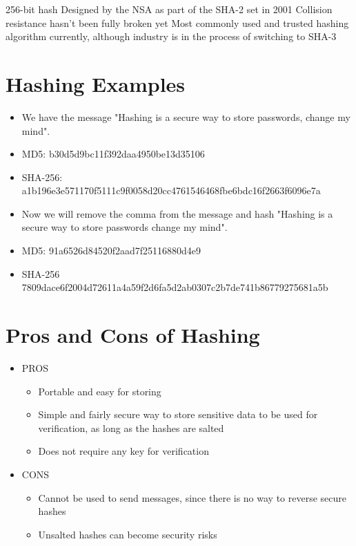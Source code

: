 \documentclass{article}
\begin{document}
		
		
		
		256-bit hash
		Designed by the NSA as part of the SHA-2 set in 2001
		Collision resistance hasn't been fully broken yet
		Most commonly used and trusted hashing algorithm currently, although industry is in the process of switching to SHA-3\newline


\section{Hashing Examples}
	\begin{itemize}
		\item We have the message "Hashing is a secure way to store passwords, change my mind".
		\item MD5: b30d5d9bc11f392daa4950be13d35106
		\item SHA-256: a1b196e3e571170f5111c9f0058d20cc4761546468fbe6bdc16f2663f6096e7a
		\item Now we will remove the comma from the message and hash "Hashing is a secure way to store passwords change my mind".
		\item MD5: 91a6526d84520f2aad7f25116880d4e9
		\item SHA-256 7809dace6f2004d72611a4a59f2d6fa5d2ab0307c2b7de741b86779275681a5b\newline
	\end{itemize}

\section{Pros and Cons of Hashing}
	\begin{itemize}
		\item PROS
		\begin{itemize}
			\item Portable and easy for storing
			\item Simple and fairly secure way to store sensitive data to be used for verification, as long as the hashes are salted
			\item Does not require any key for verification 
		\end{itemize}
		\item CONS
		\begin{itemize}
			\item Cannot be used to send messages, since there is no way to reverse secure hashes
			\item Unsalted hashes can become security risks   \newline
		\end{itemize}
		
	\end{itemize}
\end{document}
